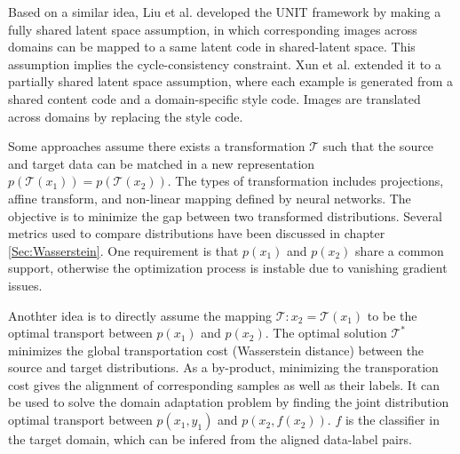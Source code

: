 \documentclass{article}
\begin{document}
Based on a similar idea, Liu et al. \cite{NIPS2017_6672} developed the UNIT framework by making a fully shared latent space assumption, in which corresponding images across domains can be mapped to a same latent code in shared-latent space. This assumption implies the cycle-consistency constraint. Xun et al. \cite{Huang_2018_ECCV} extended it to a partially shared latent space assumption, where each example is generated from a shared content code and a domain-specific style code. Images are translated across domains by replacing the style code.


Some approaches \cite{Gong:2016:DAC:3045390.3045689,4967588,Ganin:2016:DTN:2946645.2946704} assume there exists a transformation $\mathcal{T}$ such that the source and target data can be matched in a new representation $p(\mathcal{T}(x_1)) = p(\mathcal{T}(x_2))$. The types of transformation includes projections, affine transform, and non-linear mapping defined by neural networks. The objective is to minimize the gap between two transformed distributions. Several metrics used to compare distributions have been discussed in chapter \ref{Sec:Wasserstein}. One requirement is that $p(x_1)$ and $p(x_2)$ share a common support, otherwise the optimization process is instable due to vanishing gradient issues.

Anothter idea is to directly assume the mapping $\mathcal{T}: x_2 = \mathcal{T}(x_1)$ to be the optimal transport between $p(x_1)$ and $p(x_2)$. The optimal solution $\mathcal{T}^*$ minimizes the global transportation cost (Wasserstein distance) between the source and target distributions. As a by-product, minimizing the transporation cost gives the alignment of corresponding samples as well as their labels. It can be used to solve the domain adaptation problem \cite{10.1007/978-3-030-01225-0_28} by finding the joint distribution optimal transport between $p(x_1, y_1)$ and $p(x_2, f(x_2))$. $f$ is the classifier in the target domain, which can be infered from the aligned data-label pairs.
\end{document}
